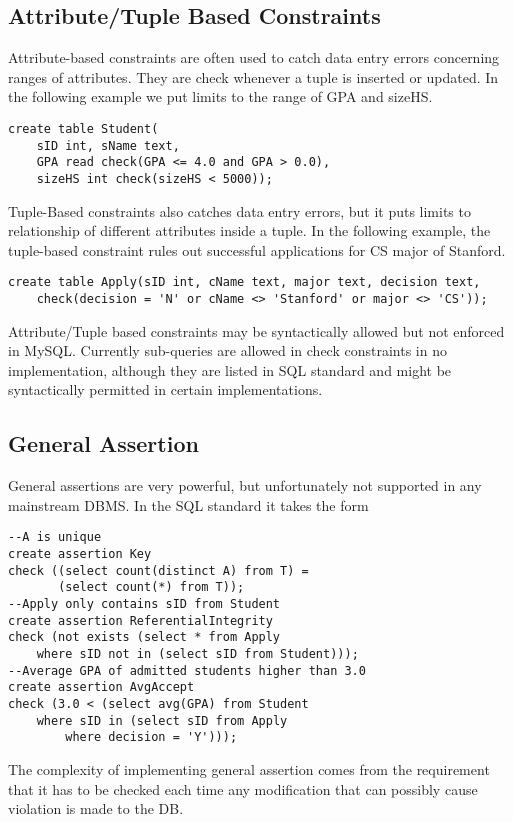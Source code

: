 \subsection{Attribute/Tuple Based Constraints}
Attribute-based constraints are often used to catch data entry errors concerning ranges of attributes. They are check whenever a tuple is inserted or updated. In the following example we put limits to the range of GPA and sizeHS. 
\begin{lstlisting}
create table Student(
	sID int, sName text,
	GPA read check(GPA <= 4.0 and GPA > 0.0),
	sizeHS int check(sizeHS < 5000));
\end{lstlisting}
Tuple-Based constraints also catches data entry errors, but it puts limits to relationship of different attributes inside a tuple. In the following example, the tuple-based constraint rules out successful applications for CS major of Stanford.  
\begin{lstlisting}
create table Apply(sID int, cName text, major text, decision text,
	check(decision = 'N' or cName <> 'Stanford' or major <> 'CS'));
\end{lstlisting}
Attribute/Tuple based constraints may be syntactically allowed but not enforced in MySQL. Currently sub-queries are allowed in check constraints in no implementation, although they are listed in SQL standard and might be syntactically permitted in certain implementations.  
\subsection{General Assertion}
General assertions are very powerful, but unfortunately not supported in any mainstream DBMS. In the SQL standard it takes the form
\begin{lstlisting}
--A is unique
create assertion Key
check ((select count(distinct A) from T) =
       (select count(*) from T));
--Apply only contains sID from Student
create assertion ReferentialIntegrity
check (not exists (select * from Apply
	where sID not in (select sID from Student)));
--Average GPA of admitted students higher than 3.0
create assertion AvgAccept
check (3.0 < (select avg(GPA) from Student 
	where sID in (select sID from Apply 
		where decision = 'Y')));
\end{lstlisting}
The complexity of implementing general assertion comes from the requirement that it has to be checked each time any modification that can possibly cause violation is made to the DB.
